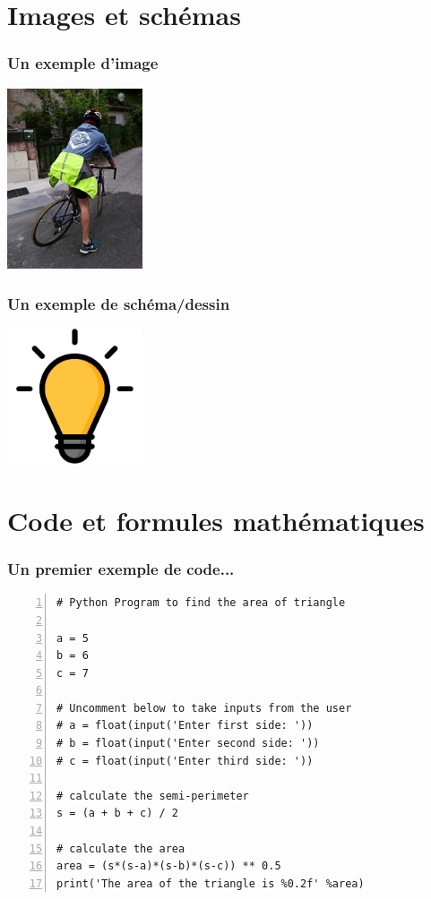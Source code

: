 \documentclass{beamer}
\begin{document}
\section{Images et schémas}

\begin{frame}
  \frametitle{Un exemple d'image}
  \begin{center}
    \includegraphics[width=4cm]{image.jpg}
  \end{center}
\end{frame}

\begin{frame}
  \frametitle{Un exemple de schéma/dessin}
  \begin{center}
    \includegraphics[width=4cm]{dessin.pdf} 
  \end{center}
\end{frame}

\section{Code et formules mathématiques}

\begin{frame}[fragile]
  \frametitle{Un premier exemple de code...}
  \begin{small}
  \begin{lstlisting}[numbers=left,frame=trBL]
# Python Program to find the area of triangle

a = 5
b = 6
c = 7

# Uncomment below to take inputs from the user
# a = float(input('Enter first side: '))
# b = float(input('Enter second side: '))
# c = float(input('Enter third side: '))

# calculate the semi-perimeter
s = (a + b + c) / 2

# calculate the area
area = (s*(s-a)*(s-b)*(s-c)) ** 0.5
print('The area of the triangle is %0.2f' %area)
\end{lstlisting}
\end{small}
\end{frame}
\end{document}
